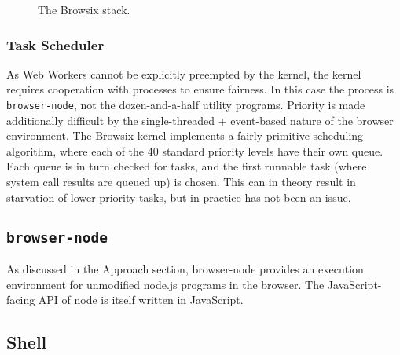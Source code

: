 \documentclass{acm_proc_article-sp}
\begin{document}
\begin{figure}
\centering
{}
\caption{The Browsix stack.}
\end{figure}

\subsubsection{Task Scheduler}

As Web Workers cannot be explicitly preempted by the kernel, the
kernel requires cooperation with processes to ensure fairness.  In
this case the process is \texttt{browser-node}, not the
dozen-and-a-half utility programs.  Priority is made additionally
difficult by the single-threaded + event-based nature of the browser
environment.  The Browsix kernel implements a fairly primitive
scheduling algorithm, where each of the 40 standard priority levels
have their own queue.  Each queue is in turn checked for tasks, and
the first runnable task (where system call results are queued up) is
chosen.  This can in theory result in starvation of lower-priority
tasks, but in practice has not been an issue.

\subsection{\texttt{browser-node}}

As discussed in the Approach section, browser-node provides an
execution environment for unmodified node.js programs in the browser.
The JavaScript-facing API of node is itself written in JavaScript.

\subsection{Shell}
\end{document}

